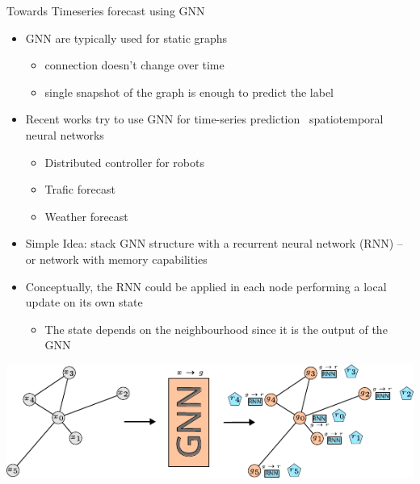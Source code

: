\documentclass[presentation, 9pt]{beamer}\mode<presentation>{\usetheme{AMSBolognaFC}}
\begin{document}
\begin{frame}[fragile]{Towards Timeseries forecast using GNN}
\begin{itemize}
	\item GNN are typically used for static graphs
	\begin{itemize}
		\item connection doesn't change over time
		\item single snapshot of the graph is enough to predict the label
	\end{itemize}
	\item Recent works try to use GNN for time-series prediction \faArrowRight \, spatiotemporal neural networks
	\begin{itemize}
		\item Distributed controller for robots ~
		\item Trafic forecast~
		\item Weather forecast~
	\end{itemize}
	\item Simple Idea: stack GNN structure with a recurrent neural network (RNN) -- or network with memory capabilities
	\item Conceptually, the RNN could be applied in each node performing a local update on its own state
	\begin{itemize}
		\item The state depends on the neighbourhood since it is the output of the GNN
	\end{itemize}	
	\centering
\end{itemize}
\includegraphics[width=\textwidth]{img/idea.pdf}

\end{frame}
\end{document}

